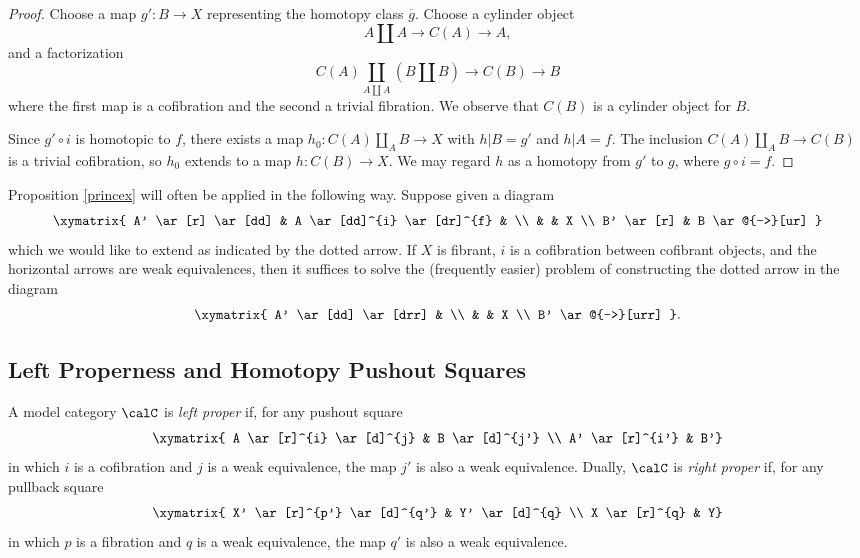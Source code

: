 \begin{proof}
Choose a map $g': B \rightarrow X$ representing the homotopy class $\overline{g}$.
Choose a cylinder object
$$A \coprod A \rightarrow C(A) \rightarrow A,$$
and a factorization
$$ C(A) \coprod_{A \coprod A} (B \coprod B) \rightarrow C(B) \rightarrow B$$
where the first map is a cofibration and the second a trivial fibration. We observe that
$C(B)$ is a cylinder object for $B$.

Since $g' \circ i$ is homotopic to $f$, there exists a map $h_0: C(A) \coprod_{A} B \rightarrow X$
with $h|B = g'$ and $h|A = f$. The inclusion $C(A) \coprod_{A} B \rightarrow C(B)$ is a trivial cofibration, so $h_0$ extends to a map $h: C(B) \rightarrow X$. We may regard $h$ as a homotopy from $g'$ to $g$, where $g \circ i = f$.
\end{proof}

Proposition \ref{princex} will often be applied in the following way. Suppose given a diagram
$$ \xymatrix{ A' \ar[r] \ar[dd] & A \ar[dd]^{i} \ar[dr]^{f} & \\
& & X \\
B' \ar[r] & B \ar@{-->}[ur] } $$
which we would like to extend as indicated by the dotted arrow. If $X$ is fibrant, $i$ is a cofibration between cofibrant objects, and the horizontal arrows are weak equivalences, then it suffices
to solve the (frequently easier) problem of constructing the dotted arrow in the diagram
$$ \xymatrix{ A' \ar[dd] \ar[drr] & \\
& & X \\
B' \ar@{-->}[urr] }.$$

\subsection{Left Properness and Homotopy Pushout Squares}\label{hopush}

\begin{definition}
A model category $\calC$ is {\it left proper} if, for any pushout square
$$ \xymatrix{ A \ar[r]^{i} \ar[d]^{j} & B \ar[d]^{j'} \\
A' \ar[r]^{i'} & B'}$$
in which $i$ is a cofibration and $j$ is a weak equivalence, the map $j'$ is also a weak equivalence. Dually, $\calC$ is {\it right proper} if, for any pullback square
$$ \xymatrix{ X' \ar[r]^{p'} \ar[d]^{q'} & Y' \ar[d]^{q} \\
X \ar[r]^{q} & Y}$$
in which $p$ is a fibration and $q$ is a weak equivalence, the map $q'$ is also a weak equivalence.
\end{definition}

